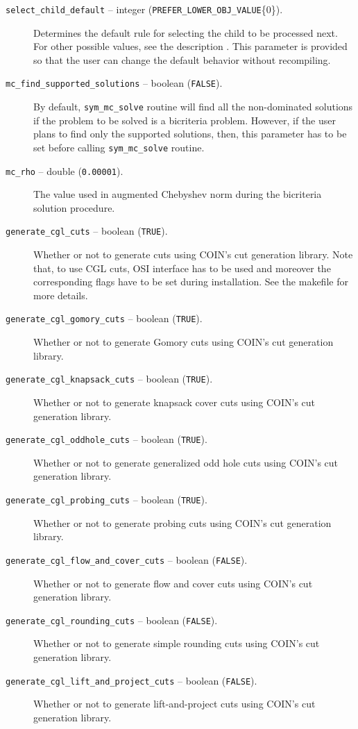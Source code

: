 \begin{description}
\item[{\tt select\_child\_default} -- integer 
({\tt PREFER\_LOWER\_OBJ\_VALUE}\{0\}).]
Determines the default rule for selecting the child to be processed
next. For other possible values, see the description . This
parameter is provided so that the user can change the default behavior
without recompiling.

\item[{\tt mc\_find\_supported\_solutions} -- boolean ({\tt FALSE}).]
By default, {\tt sym\_mc\_solve} routine will find all the non-dominated 
solutions if the problem to be solved is 
a bicriteria problem. However, if the user plans to find only the supported 
solutions, then, this parameter has to be set before 
calling {\tt sym\_mc\_solve} routine. 

\item[{\tt mc\_rho} -- double ({\tt 0.00001}).]
The value used in augmented Chebyshev norm during the bicriteria 
solution procedure.

\item[{\tt generate\_cgl\_cuts} -- boolean ({\tt TRUE}).]
Whether or not to generate cuts using COIN's cut generation library. 
Note that, to use CGL cuts, OSI interface has to be used and moreover the 
corresponding flags have to be set during installation. See the makefile for 
more details.

\item[{\tt generate\_cgl\_gomory\_cuts} -- boolean ({\tt TRUE}).]
Whether or not to generate Gomory cuts using COIN's cut generation library. 

\item[{\tt generate\_cgl\_knapsack\_cuts} -- boolean ({\tt TRUE}).]
Whether or not to generate knapsack cover cuts using COIN's cut generation 
library. 

\item[{\tt generate\_cgl\_oddhole\_cuts} -- boolean ({\tt TRUE}).]
Whether or not to generate generalized odd hole cuts using COIN's cut 
generation library. 

\item[{\tt generate\_cgl\_probing\_cuts} -- boolean ({\tt TRUE}).]
Whether or not to generate probing cuts using COIN's cut generation library. 

\item[{\tt generate\_cgl\_flow\_and\_cover\_cuts} -- boolean ({\tt FALSE}).]
Whether or not to generate flow and cover cuts using COIN's cut generation 
library. 

\item[{\tt generate\_cgl\_rounding\_cuts} -- boolean ({\tt FALSE}).]
Whether or not to generate simple rounding cuts using COIN's cut generation 
library. 

\item[{\tt generate\_cgl\_lift\_and\_project\_cuts} -- boolean ({\tt FALSE}).]
Whether or not to generate lift-and-project cuts using COIN's cut generation 
library. 

\end{description}

